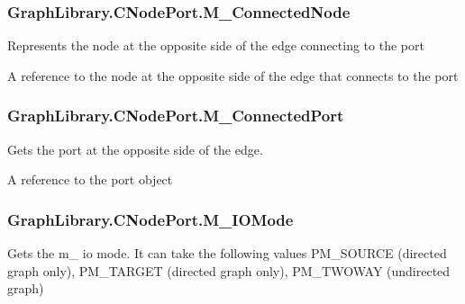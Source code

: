 \subsubsection[{M\+\_\+\+Connected\+Node}]{ Graph\+Library.\+C\+Node\+Port.\+M\+\_\+\+Connected\+Node\hspace{0.3cm}{\ttfamily [get]}}\label{class_graph_library_1_1_c_node_port_a00cabaca834e49fe3c5d057e8122bea9}


Represents the node at the opposite side of the edge connecting to the port 

A reference to the node at the opposite side of the edge that connects to the port \hypertarget{class_graph_library_1_1_c_node_port_a2ed73460c9543943fe37b19c57813a4a}{}
\subsubsection[{M\+\_\+\+Connected\+Port}]{ Graph\+Library.\+C\+Node\+Port.\+M\+\_\+\+Connected\+Port\hspace{0.3cm}{\ttfamily [get]}}\label{class_graph_library_1_1_c_node_port_a2ed73460c9543943fe37b19c57813a4a}


Gets the port at the opposite side of the edge. 

A reference to the port object \hypertarget{class_graph_library_1_1_c_node_port_a2cb7f035efed2fe8374be94bd354529a}{}
\subsubsection[{M\+\_\+\+I\+O\+Mode}]{ Graph\+Library.\+C\+Node\+Port.\+M\+\_\+\+I\+O\+Mode\hspace{0.3cm}{\ttfamily [get]}}\label{class_graph_library_1_1_c_node_port_a2cb7f035efed2fe8374be94bd354529a}


Gets the m\+\_\+ io mode. It can take the following values P\+M\+\_\+\+S\+O\+U\+R\+C\+E (directed graph only), P\+M\+\_\+\+T\+A\+R\+G\+E\+T (directed graph only), P\+M\+\_\+\+T\+W\+O\+W\+A\+Y (undirected graph) 

